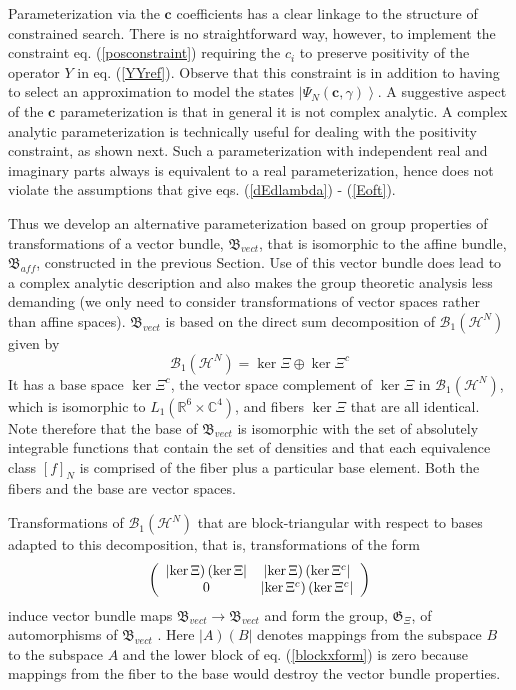 \documentclass[aps,preprint]{revtex4}%
\begin{document}
Parameterization via the $\mathbf{c}$ coefficients has a clear linkage to the
structure of constrained search. There is no straightforward way, however, to
implement the constraint eq. (\ref{posconstraint}) requiring the $c_{i}$ to
preserve positivity of the operator $Y$ in eq. (\ref{YYref}). Observe that
this constraint is in addition to having to select an approximation to model
the states $\left|  \Psi_{N}(\mathbf{c},\gamma)\right\rangle $. A suggestive
aspect of the $\mathbf{c}$ parameterization is that in general it is not
complex analytic. A complex analytic parameterization is technically useful
for dealing with the positivity constraint, as shown next. Such a
parameterization with independent real and imaginary parts always is
equivalent to a real parameterization, hence does not violate the assumptions
that give eqs. (\ref{dEdlambda}) - (\ref{Eoft}).

Thus we develop an alternative parameterization based on group properties of
transformations of a vector bundle, $\mathfrak{B}_{vect}$, that is isomorphic
to the affine bundle, $\mathfrak{B}_{aff}$, constructed in the previous
Section. Use of this vector bundle does lead to a complex analytic description
and also makes the group theoretic analysis less demanding (we only need to
consider transformations of vector spaces rather than affine spaces).
$\mathfrak{B}_{vect}$ is based on the direct sum decomposition of
$\mathcal{B}_{1}\left(  \mathcal{H}^{N}\right)  $ given by
\begin{equation}
\mathcal{B}_{1}\left(  \mathcal{H}^{N}\right)  =\ker\Xi\oplus\ker\Xi^{c}
\label{directsum}%
\end{equation}
It has a base space $\ker\Xi^{c}$, the vector space complement of $\ker\Xi$ in
$\mathcal{B}_{1}\left(  \mathcal{H}^{N}\right)  $, which is isomorphic to
$L_{1}(\mathbb{R}^{6}\times\mathbb{C}^{4})$, and fibers $\ker\Xi$ that are all
identical. Note therefore that the base of $\mathfrak{B}_{vect}$ is isomorphic
with the set of absolutely integrable functions that contain the set of
densities and that each equivalence class $[f]_{N}$ is comprised of the fiber
plus a particular base element. Both the fibers and the base are vector spaces.

Transformations of $\mathcal{B}_{1}\left(  \mathcal{H}^{N}\right)  $ that are
block-triangular with respect to bases adapted to this decomposition, that is,
transformations of the form
\begin{equation}
\left(
\begin{array}
[c]{cc}%
\left|  \ker\Xi\right)  \left(  \ker\Xi\right|  & \left|  \ker\Xi\right)
\left(  \ker\Xi^{c}\right| \\
0 & \left|  \ker\Xi^{c}\right)  \left(  \ker\Xi^{c}\right|
\end{array}
\right)  \label{blockxform}%
\end{equation}
induce vector bundle maps $\mathfrak{B}_{vect}\rightarrow\mathfrak{B}_{vect}$
and form the group, $\mathfrak{G}_{\Xi}$, of automorphisms of $\mathfrak{B}%
_{vect}$ \cite{Bruhat}. Here $\left|  A\right)  \left(  B\right|  $ denotes
mappings from the subspace $B$ to the subspace $A$ and the lower block of eq.
(\ref{blockxform}) is zero because mappings from the fiber to the base would
destroy the vector bundle properties.
\end{document}
